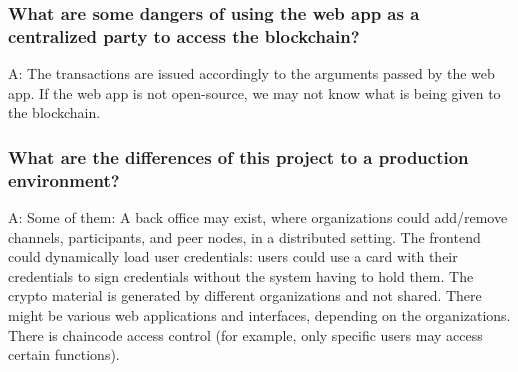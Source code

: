 \documentclass[12pt,a4paper]{article}
\begin{document}
\subsubsection*{What are some dangers of using the web app as a centralized party to access the blockchain?}
A: The transactions are issued accordingly to the arguments passed by the web app. If the web app is not open-source, we may not know what is being given to the blockchain.


\subsubsection*{What are the differences of this project to a production environment?}
A: Some of them: A back office may exist, where organizations could add/remove channels, participants, and peer nodes, in a distributed setting. The frontend could dynamically load user credentials: users could use a card with their credentials to sign credentials without the system having to hold them. The crypto material is generated by different organizations and not shared. There might be various web applications and interfaces, depending on the organizations. There is chaincode access control (for example, only specific users may access certain functions).


\end{document}
